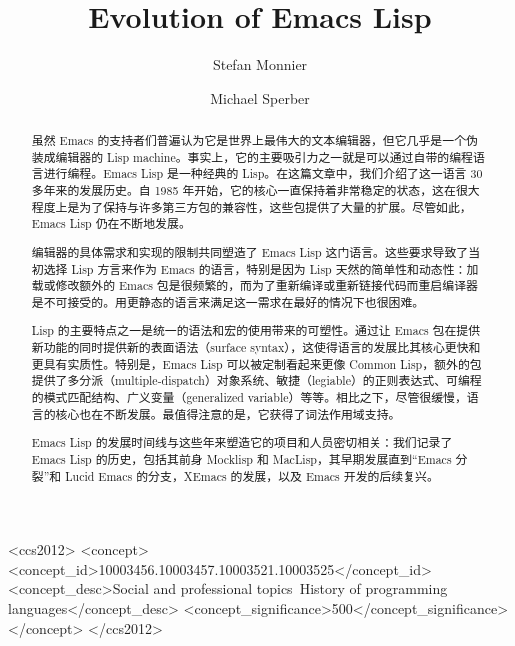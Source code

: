 \documentclass[format=acmsmall,screen]{acmart}
\begin{document}
\title{Evolution of Emacs Lisp}

\author{Stefan Monnier}
\author{Michael Sperber}


\begin{abstract}
虽然 Emacs 的支持者们普遍认为它是世界上最伟大的文本编辑器，但它几乎是一个伪装成编辑器的 Lisp machine。事实上，它的主要吸引力之一就是可以通过自带的编程语言进行编程。Emacs Lisp 是一种经典的 Lisp。在这篇文章中，我们介绍了这一语言 30 多年来的发展历史。自 1985 年开始，它的核心一直保持着非常稳定的状态，这在很大程度上是为了保持与许多第三方包的兼容性，这些包提供了大量的扩展。尽管如此，Emacs Lisp 仍在不断地发展。

编辑器的具体需求和实现的限制共同塑造了 Emacs Lisp 这门语言。这些要求导致了当初选择 Lisp 方言来作为 Emacs 的语言，特别是因为 Lisp 天然的简单性和动态性：加载或修改额外的 Emacs 包是很频繁的，而为了重新编译或重新链接代码而重启编译器是不可接受的。用更静态的语言来满足这一需求在最好的情况下也很困难。

Lisp 的主要特点之一是统一的语法和宏的使用带来的可塑性。通过让 Emacs 包在提供新功能的同时提供新的表面语法（surface syntax），这使得语言的发展比其核心更快和更具有实质性。特别是，Emacs Lisp 可以被定制看起来更像 Common Lisp，额外的包提供了多分派（multiple-dispatch）对象系统、敏捷（legiable）的正则表达式、可编程的模式匹配结构、广义变量（generalized variable）等等。相比之下，尽管很缓慢，语言的核心也在不断发展。最值得注意的是，它获得了词法作用域支持。

Emacs Lisp 的发展时间线与这些年来塑造它的项目和人员密切相关：我们记录了 Emacs Lisp 的历史，包括其前身 Mocklisp 和 MacLisp，其早期发展直到“Emacs 分裂”和 Lucid Emacs 的分支，XEmacs 的发展，以及 Emacs 开发的后续复兴。
\end{abstract}

\begin{CCSXML}
<ccs2012>
<concept>
<concept_id>10003456.10003457.10003521.10003525</concept_id>
<concept_desc>Social and professional topics~History of programming languages</concept_desc>
<concept_significance>500</concept_significance>
</concept>
</ccs2012>
\end{CCSXML}
\end{document}
